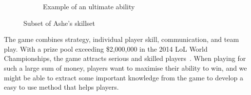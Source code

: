 \begin{figure}[!htb]
\begin{subfigure}[b]{0.49\textwidth}
    \caption{Example of an ultimate ability}
    \label{fig:enchanted}
  \end{subfigure}
  \caption{Subset of Ashe's skillset~\cite{ashe}}\label{fig:ashe}
\end{figure}

The game combines strategy, individual player skill, communication, and team play. With a prize pool exceeding \$2,000,000 in the 2014 LoL World Championships, the game attracts serious and skilled players~\cite{lolprize}. When playing for such a large sum of money, players want to maximise their ability to win, and we might be able to extract some important knowledge from the game to develop a easy to use method that helps players.

